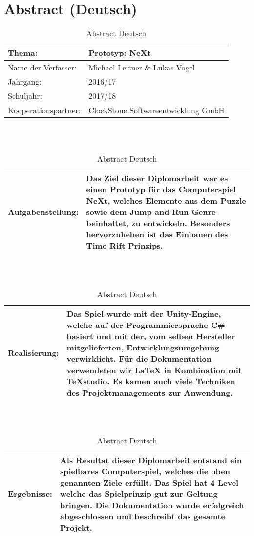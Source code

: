 \chapter*{Abstract (Deutsch)}
\def \currentAuthor {Lukas Vogel}
\begin{table}[H]
	
	\renewcommand{\arraystretch}{1.5}
\begin{tabular}{|p{4cm}|p{10cm}|}
	\hline 
	Thema: &  Prototyp: NeXt\\ 
	\hline
	 Name der Verfasser: & Michael Leitner \& Lukas Vogel  \\ 
	\hline 
	Jahrgang: & 2016/17 \\
	\hline
	 Schuljahr: & 2017/18 \\
	\hline 
	Kooperationspartner: & ClockStone Softwareentwicklung GmbH\\
	\hline
\end{tabular}
\ \\
\ \\
\begin{tabular}{|p{4cm}|p{10cm}|}
	\hline
	Aufgabenstellung: & Das Ziel dieser Diplomarbeit war es einen Prototyp für das Computerspiel NeXt, welches Elemente aus dem Puzzle sowie dem Jump and Run Genre beinhaltet, zu entwickeln. Besonders hervorzuheben ist das Einbauen des Time Rift Prinzips. \\
	\hline
\end{tabular} 
\ \\
\ \\
\begin{tabular}{|p{4cm}|p{10cm}|}
	\hline
	Realisierung: & Das Spiel wurde mit der Unity-Engine, welche auf der Programmiersprache C\# basiert und mit der, vom selben Hersteller mitgelieferten, Entwicklungsumgebung verwirklicht. Für die Dokumentation verwendeten wir LaTeX in Kombination mit TeXstudio. Es kamen auch viele Techniken des Projektmanagements zur Anwendung.\\
	\hline
\end{tabular}
\ \\
\ \\
\begin{tabular}{|p{4cm}|p{10cm}|}
	\hline
	Ergebnisse: & Als Resultat dieser Diplomarbeit entstand ein spielbares Computerspiel, welches die oben genannten Ziele erfüllt. Das Spiel hat 4 Level welche das Spielprinzip gut zur Geltung bringen. Die Dokumentation wurde erfolgreich abgeschlossen und beschreibt das gesamte Projekt. \\
	\hline
\end{tabular}
\caption{Abstract Deutsch}
\end{table}
